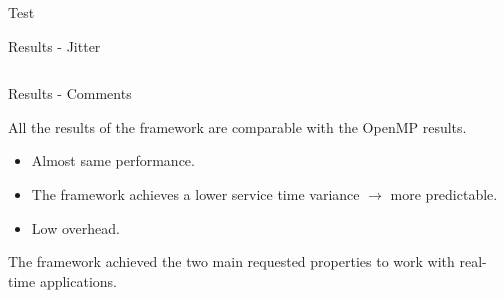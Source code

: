 \documentclass[xcolor=dvipsnames]{beamer}
\begin{document}
\begin{section}{Test}
\begin{frame}{\hskip 0.3cm Results - Jitter}
\begin{columns}
\begin{column}{5cm}
\end{column}

\end{columns}

\end{frame}












\begin{frame}{\hskip 0.3cm Results - Comments}

All the results of the framework are comparable with the OpenMP results.

\begin{itemize}

\item Almost same performance.

\item The framework achieves a lower service time variance $\rightarrow$ more predictable.

\item Low overhead.

\end{itemize}

The framework achieved the two main requested properties to work with real-time applications.

\end{frame}












\end{section}
\end{document}
